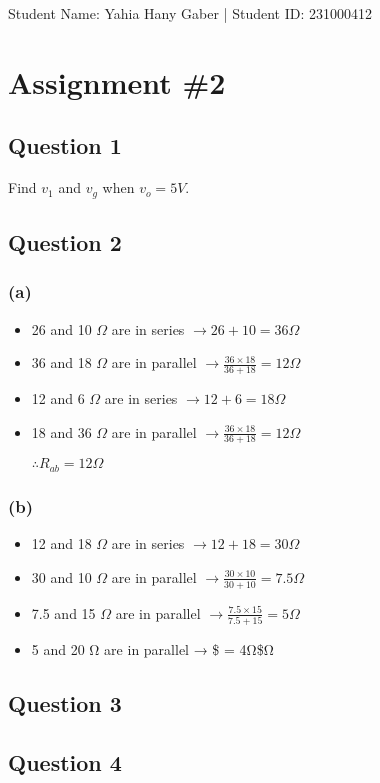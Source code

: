 \documentclass[11pt]{article}
\author{Yahia Gaber}
\date{\today}
\title{}
\begin{document}
\tableofcontents

Student Name: Yahia Hany Gaber |
Student ID: 231000412
\section{Assignment \#2}
\label{sec:org108fe0e}

\subsection{Question 1}
\label{sec:orgb791164}

Find \(v_1\) and \(v_g\) when \(v_o = 5V\).
\subsection{Question 2}
\label{sec:orgbe6aaae}

\subsubsection{(a)}
\label{sec:orgf2ee893}

\begin{itemize}
\item 26 and 10 \(\Omega\) are in series \(\to 26 + 10 = 36 \Omega\)

\item 36 and 18 \(\Omega\) are in parallel \(\to \frac{36 \times 18}{36 + 18} = 12 \Omega\)

\item 12 and 6 \(\Omega\) are in series \(\to 12 + 6 = 18 \Omega\)

\item 18 and 36 \(\Omega\) are in parallel \(\to \frac{36 \times 18}{36 + 18} = 12 \Omega\)

\(\therefore R_{ab} = 12 \Omega\)
\end{itemize}
\subsubsection{(b)}
\label{sec:org65c003b}

\begin{itemize}
\item 12 and 18 \(\Omega\) are in series \(\to 12 + 18 = 30 \Omega\)

\item 30 and 10 \(\Omega\) are in parallel \(\to \frac{30 \times 10}{30 + 10} = 7.5 \Omega\)

\item 7.5 and 15 \(\Omega\) are in parallel \(\to \frac{7.5 \times 15}{7.5 + 15} = 5 \Omega\)

\item 5 and 20 Ω are in parallel → \$ = 4Ω\$Ω
\end{itemize}
\subsection{Question 3}
\label{sec:org5e5eaa4}

\subsection{Question 4}
\label{sec:org27f0d2e}
\end{document}
